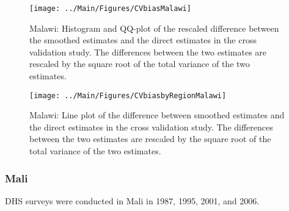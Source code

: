 \documentclass[12pt]{article}\usepackage[]{graphicx}\usepackage[]{color}
\newenvironment{knitrout}{}{} %
\begin{document}
\begin{knitrout}
\color{fgcolor}\begin{figure}[bht]

{\centering \texttt{[image: ../Main/Figures/CVbiasMalawi]} 

}

\caption[Malawi]{Malawi: Histogram and QQ-plot of the rescaled difference between the smoothed estimates and the direct estimates in the cross validation study. The differences between the two estimates are rescaled by the square root of the total variance of the two estimates.}\label{fig:unnamed-chunk-209}
\end{figure}


\end{knitrout}

\begin{knitrout}
\color{fgcolor}\begin{figure}[bht]

{\centering \texttt{[image: ../Main/Figures/CVbiasbyRegionMalawi]} 

}

\caption[Malawi]{Malawi: Line plot of the difference between smoothed estimates and the direct estimates in the cross validation study. The differences between the two estimates are rescaled by the square root of the total variance of the two estimates.}\label{fig:unnamed-chunk-210}
\end{figure}


\end{knitrout}


\clearpage
\subsubsection{Mali}





DHS surveys were conducted in Mali in 1987, 1995, 2001, and 2006.
\end{document}
